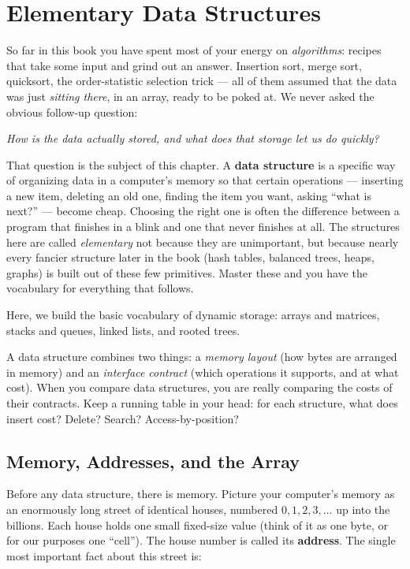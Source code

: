 \chapter{Elementary Data Structures}

So far in this book you have spent most of your energy on \emph{algorithms}: recipes that take some input and grind out an answer. Insertion sort, merge sort, quicksort, the order-statistic selection trick --- all of them assumed that the data was just \emph{sitting there}, in an array, ready to be poked at. We never asked the obvious follow-up question:

\begin{center}
\emph{How is the data actually stored, and what does that storage let us do quickly?}
\end{center}

That question is the subject of this chapter. A \textbf{data structure} is a specific way of organizing data in a computer's memory so that certain operations --- inserting a new item, deleting an old one, finding the item you want, asking ``what is next?'' --- become cheap. Choosing the right one is often the difference between a program that finishes in a blink and one that never finishes at all. The structures here are called \emph{elementary} not because they are unimportant, but because nearly every fancier structure later in the book (hash tables, balanced trees, heaps, graphs) is built out of these few primitives. Master these and you have the vocabulary for everything that follows.

Here, we build the basic vocabulary of dynamic storage: arrays and matrices,
stacks and queues, linked lists, and rooted trees.

\begin{focusbox}
A data structure combines two things: a \emph{memory layout} (how bytes are arranged in memory) and an \emph{interface contract} (which operations it supports, and at what cost). When you compare data structures, you are really comparing the costs of their contracts. Keep a running table in your head: for each structure, what does insert cost? Delete? Search? Access-by-position?
\end{focusbox}

\section{Memory, Addresses, and the Array}
\label{ch10:memory}

Before any data structure, there is memory. Picture your computer's memory as an enormously long street of identical houses, numbered $0, 1, 2, 3, \dots$ up into the billions. Each house holds one small fixed-size value (think of it as one byte, or for our purposes one ``cell''). The house number is called its \textbf{address}. The single most important fact about this street is:

